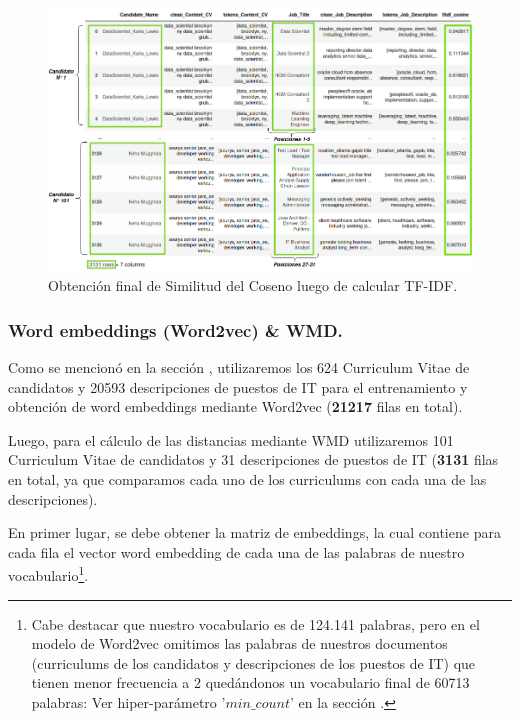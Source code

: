 \documentclass[12pt,a4paper]{article}
\begin{document}
\begin{sloppypar}
\begin{figure}[H] 
 \centering
 \includegraphics[width=1\textwidth]{images/implementacion_5/3_TF_IDF.png}
 \captionsetup{justification=centering,margin=2cm}
 \caption{Obtención final de Similitud del Coseno luego de calcular TF-IDF.} 
 \label{fig:3_TF_IDF}
\end{figure}

\subsubsection{Word embeddings (Word2vec) \& WMD.}\label{Implementacion_word_emb_y_wmd}

Como se mencionó en la sección \textit{}, utilizaremos los 624 Curriculum Vitae de candidatos y 20593 descripciones de puestos de IT para el entrenamiento y obtención de word embeddings mediante Word2vec (\textbf{21217} filas en total).

Luego, para el cálculo de las distancias mediante WMD utilizaremos 101 Curriculum Vitae de candidatos y 31 descripciones de puestos de IT (\textbf{3131} filas en total, ya que comparamos cada uno de los curriculums con cada una de las descripciones).

En primer lugar, se debe obtener la matriz de embeddings, la cual contiene para cada fila el vector word embedding de cada una de las palabras de nuestro vocabulario\footnote{Cabe destacar que nuestro vocabulario es de 124.141 palabras, pero en el modelo de Word2vec omitimos las palabras de nuestros documentos (curriculums de los candidatos y descripciones de los puestos de IT) que tienen menor frecuencia a 2 quedándonos un vocabulario final de 60713 palabras: Ver hiper-parámetro '$min\_count$' en la sección \textit{}.}. 


\end{sloppypar}
\end{document}
